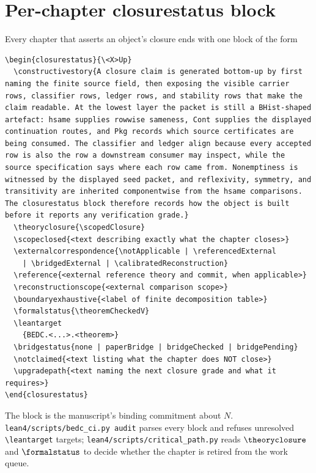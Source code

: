 \section{Per-chapter closurestatus block}
\label{sec:per-chapter-closurestatus}

Every chapter that asserts an object's closure ends with one block of the form

\begin{verbatim}
\begin{closurestatus}{\<X>Up}
  \constructivestory{A closure claim is generated bottom-up by first naming the finite source field, then exposing the visible carrier rows, classifier rows, ledger rows, and stability rows that make the claim readable. At the lowest layer the packet is still a BHist-shaped artefact: hsame supplies rowwise sameness, Cont supplies the displayed continuation routes, and Pkg records which source certificates are being consumed. The classifier and ledger align because every accepted row is also the row a downstream consumer may inspect, while the source specification says where each row came from. Nonemptiness is witnessed by the displayed seed packet, and reflexivity, symmetry, and transitivity are inherited componentwise from the hsame comparisons. The closurestatus block therefore records how the object is built before it reports any verification grade.}
  \theoryclosure{\scopedClosure}
  \scopeclosed{<text describing exactly what the chapter closes>}
  \externalcorrespondence{\notApplicable | \referencedExternal
    | \bridgedExternal | \calibratedReconstruction}
  \reference{<external reference theory and commit, when applicable>}
  \reconstructionscope{<external comparison scope>}
  \boundaryexhaustive{<label of finite decomposition table>}
  \formalstatus{\theoremCheckedV}
  \leantarget
    {BEDC.<...>.<theorem>}
  \bridgestatus{none | paperBridge | bridgeChecked | bridgePending}
  \notclaimed{<text listing what the chapter does NOT close>}
  \upgradepath{<text naming the next closure grade and what it requires>}
\end{closurestatus}
\end{verbatim}

The block is the manuscript's binding commitment about $N$. \texttt{lean4/scripts/bedc\_ci.py audit} parses every block and refuses unresolved \texttt{\textbackslash leantarget} targets; \texttt{lean4/scripts/critical\_path.py} reads $\theoryclosure$ and $\formalstatus$ to decide whether the chapter is retired from the work queue.


